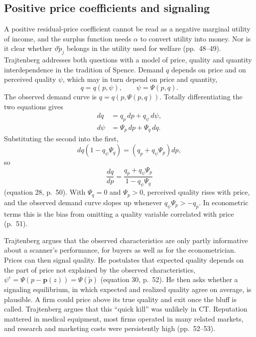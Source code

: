 \subsection{Positive price coefficients and signaling}\label{sec:10-ct-signal}

A positive residual-price coefficient cannot be read as a negative marginal utility of income, and the surplus
function needs $\alpha$ to convert utility into money. Nor is it clear whether $\vartheta\tilde p_j$ belongs in
the utility used for welfare (pp.~48--49). Trajtenberg addresses both questions with a model of price, quality and
quantity interdependence in the tradition of Spence. Demand $q$ depends on price and on perceived quality $\psi$,
which may in turn depend on price and quantity,
\begin{equation}\label{eq:10-spence}
q = q(p,\psi),
\qquad
\psi = \Psi(p,q) .
\end{equation}
The observed demand curve is $q = q(p,\Psi(p,q))$. Totally differentiating the two equations gives
\begin{align*}
dq &= q_p\,dp + q_\psi\,d\psi, \\
d\psi &= \Psi_p\,dp + \Psi_q\,dq .
\end{align*}
Substituting the second into the first,
\begin{equation*}
dq\left(1 - q_\psi\Psi_q\right) = \left(q_p + q_\psi\Psi_p\right)dp,
\end{equation*}
so
\begin{equation}\label{eq:10-spence-slope}
\frac{dq}{dp} = \frac{q_p + q_\psi\Psi_p}{1 - q_\psi\Psi_q}
\end{equation}
(equation 28, p.~50). With $\Psi_q = 0$ and $\Psi_p > 0$, perceived quality rises with price, and the observed
demand curve slopes up whenever $q_\psi\Psi_p > -q_p$. In econometric terms this is the bias from omitting a quality
variable correlated with price (p.~51).

Trajtenberg argues that the observed characteristics are only partly informative about a scanner's performance,
for buyers as well as for the econometrician. Prices can then signal quality. He postulates that expected quality
depends on the part of price not explained by the observed characteristics, $\psi^e = \Psi(p - \mathbf{p}(z)) =
\Psi(\tilde p)$ (equation 30, p.~52). He then asks whether a signaling equilibrium, in which expected and realized
quality agree on average, is plausible. A firm could price above its true quality and exit once the bluff is
called. Trajtenberg argues that this ``quick kill'' was unlikely in CT. Reputation mattered in medical equipment,
most firms operated in many related markets, and research and marketing costs were persistently high (pp.~52--53).

